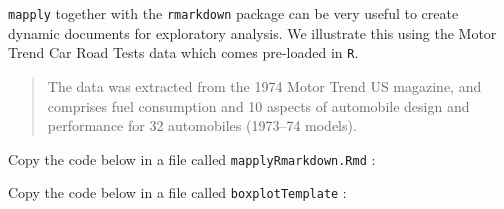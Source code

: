 \documentclass[]{book}
\theoremstyle{definition}
\theoremstyle{definition}
\theoremstyle{definition}
\theoremstyle{remark}
\begin{document}
\texttt{mapply} together with the \texttt{rmarkdown} package
\citep{R-rmarkdown} can be very useful to create dynamic documents for
exploratory analysis. We illustrate this using the Motor Trend Car Road
Tests data which comes pre-loaded in \texttt{R}.

\begin{quote}
The data was extracted from the 1974 Motor Trend US magazine, and
comprises fuel consumption and 10 aspects of automobile design and
performance for 32 automobiles (1973--74 models).
\end{quote}

Copy the code below in a file called \texttt{mapplyRmarkdown.Rmd} :

Copy the code below in a file called \texttt{boxplotTemplate} :


\end{document}
